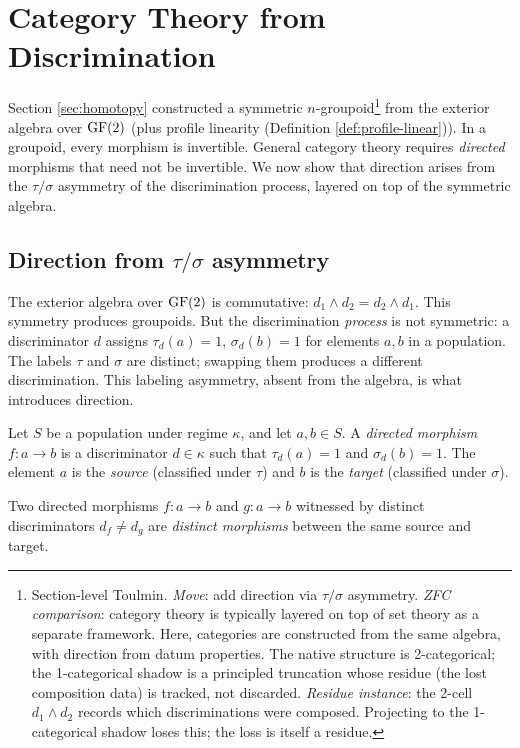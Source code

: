 \section{Category Theory from Discrimination}\label{sec:cattheory}

Section \ref{sec:homotopy} constructed a symmetric $n$-groupoid\footnote{Section-level Toulmin. \emph{Move}: add direction via $\tau/\sigma$ asymmetry. \emph{ZFC comparison}: category theory is typically layered on top of set theory as a separate framework. Here, categories are constructed from the same algebra, with direction from datum properties. The native structure is 2-categorical; the 1-categorical shadow is a principled truncation whose residue (the lost composition data) is tracked, not discarded. \emph{Residue instance}: the 2-cell $d_1 \wedge d_2$ records which discriminations were composed. Projecting to the 1-categorical shadow loses this; the loss is itself a residue.}
from the exterior algebra over $\operatorname{GF}(2)$
(plus profile linearity (Definition \ref{def:profile-linear})). In a groupoid, every
morphism is invertible. General category theory requires
\emph{directed} morphisms that need not be invertible. We now
show that direction arises from the $\tau/\sigma$ asymmetry
of the discrimination process, layered on top of the symmetric
algebra.

\subsection{Direction from $\tau/\sigma$ asymmetry}

\begin{remark}
The exterior algebra over $\operatorname{GF}(2)$ is commutative:
$d_1 \wedge d_2 = d_2 \wedge d_1$. This symmetry produces
groupoids. But the discrimination \emph{process} is not
symmetric: a discriminator $d$ assigns $\tau_d(a) = 1$,
$\sigma_d(b) = 1$ for elements $a, b$ in a population.
The labels $\tau$ and $\sigma$ are distinct; swapping them
produces a different discrimination. This labeling asymmetry,
absent from the algebra, is what introduces direction.
\end{remark}

\begin{definition}\label{def:directed-morphism}
Let $S$ be a population under regime $\kappa$, and let
$a, b \in S$. A \emph{directed morphism} $f: a \to b$ is a
discriminator $d \in \kappa$ such that $\tau_d(a) = 1$ and
$\sigma_d(b) = 1$. The element $a$ is the \emph{source}
(classified under $\tau$) and $b$ is the \emph{target}
(classified under $\sigma$).

Two directed morphisms $f: a \to b$ and $g: a \to b$
witnessed by distinct discriminators $d_f \neq d_g$ are
\emph{distinct morphisms} between the same source and target.
\end{definition}

